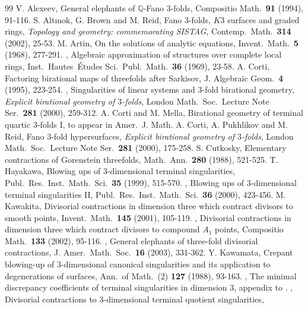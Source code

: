 \documentclass[a4paper,11pt]{amsart}
\theoremstyle{definition}
\theoremstyle{remark}
\numberwithin{equation}{section}
\newcommand{\bQ}{{\mathbb Q}}
\begin{document}

\begin{thebibliography}{99}
V. Alexeev,
General elephants of $\bQ$-Fano $3$-folds,
Compositio Math.\ \textbf{91} (1994), 91-116.
S. Alt{\i}nok, G. Brown and M. Reid,
Fano $3$-folds, $K3$ surfaces and graded rings,
\textit{Topology and geometry\textup{:} commemorating SISTAG},
Contemp.\ Math.\ \textbf{314} (2002), 25-53.
M. Artin,
On the solutions of analytic equations,
Invent.\ Math.\ \textbf{5} (1968), 277-291.
\bysame,
Algebraic approximation of structures over complete local rings,
Inst.\ Hautes\ \'Etudes Sci.\ Publ.\ Math.\ \textbf{36} (1969), 23-58.
A. Corti,
Factoring birational maps of threefolds after Sarkisov,
J. Algebraic Geom.\ \textbf{4} (1995), 223-254.
\bysame,
Singularities of linear systems and $3$-fold birational geometry,
\textit{Explicit birational geometry of $3$-folds},
London Math.\ Soc.\ Lecture Note Ser.\ \textbf{281} (2000), 259-312.
A. Corti and M. Mella,
Birational geometry of terminal quartic $3$-folds I,
to appear in Amer.\ J. Math.
A. Corti, A. Pukhlikov and M. Reid,
Fano $3$-fold hypersurfaces,
\textit{Explicit birational geometry of $3$-folds},
London Math.\ Soc.\ Lecture Note Ser.\ \textbf{281} (2000), 175-258.
S. Cutkosky,
Elementary contractions of Gorenstein threefolds,
Math.\ Ann.\ \textbf{280} (1988), 521-525.
T. Hayakawa,
Blowing ups of $3$-dimensional terminal singularities,
Publ.\ Res.\ Inst.\ Math.\ Sci.\ \textbf{35} (1999), 515-570.
\bysame,
Blowing ups of $3$-dimensional terminal singularities II,
Publ.\ Res.\ Inst.\ Math.\ Sci.\ \textbf{36} (2000), 423-456.
M. Kawakita,
Divisorial contractions in dimension three
which contract divisors to smooth points,
Invent.\ Math.\ \textbf{145} (2001), 105-119.
\bysame,
Divisorial contractions in dimension three
which contract divisors to compound $A_1$ points,
Compositio Math.\ \textbf{133} (2002), 95-116.
\bysame,
General elephants of three-fold divisorial contractions,
J. Amer.\ Math.\ Soc.\ \textbf{16} (2003), 331-362.
Y. Kawamata,
Crepant blowing-up of $3$-dimensional canonical singularities
and its application to degenerations of surfaces,
Ann.\ of Math.\ (2) \textbf{127} (1988), 93-163.
\bysame,
The minimal discrepancy coefficients
of terminal singularities in dimension $3$,
appendix to \cite{Sh92}.
\bysame,
Divisorial contractions to $3$-dimensional terminal quotient singularities,

\end{thebibliography}
\end{document}
